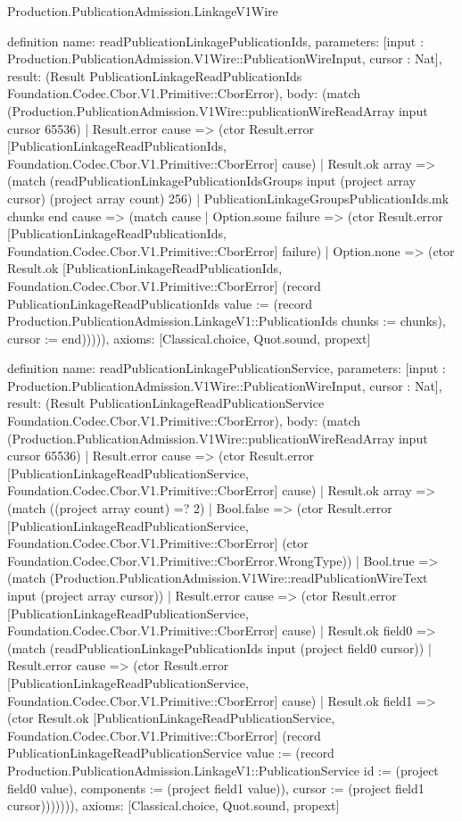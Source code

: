 \begin{lexlean}{Production.PublicationAdmission.LinkageV1Wire}
\begin{semanticmodule}
definition{
  name: readPublicationLinkagePublicationIds,
  parameters: [input : Production.PublicationAdmission.V1Wire::PublicationWireInput, cursor : Nat],
  result: (Result PublicationLinkageReadPublicationIds Foundation.Codec.Cbor.V1.Primitive::CborError),
  body: (match (Production.PublicationAdmission.V1Wire::publicationWireReadArray input cursor 65536)
    | Result.error cause => (ctor Result.error [PublicationLinkageReadPublicationIds, Foundation.Codec.Cbor.V1.Primitive::CborError] cause)
    | Result.ok array => (match (readPublicationLinkagePublicationIdsGroups input (project array cursor) (project array count) 256)
      | PublicationLinkageGroupsPublicationIds.mk chunks end cause => (match cause
        | Option.some failure => (ctor Result.error [PublicationLinkageReadPublicationIds, Foundation.Codec.Cbor.V1.Primitive::CborError] failure)
        | Option.none => (ctor Result.ok [PublicationLinkageReadPublicationIds, Foundation.Codec.Cbor.V1.Primitive::CborError] (record PublicationLinkageReadPublicationIds {value := (record Production.PublicationAdmission.LinkageV1::PublicationIds {chunks := chunks}), cursor := end}))))),
  axioms: [Classical.choice, Quot.sound, propext]
}

definition{
  name: readPublicationLinkagePublicationService,
  parameters: [input : Production.PublicationAdmission.V1Wire::PublicationWireInput, cursor : Nat],
  result: (Result PublicationLinkageReadPublicationService Foundation.Codec.Cbor.V1.Primitive::CborError),
  body: (match (Production.PublicationAdmission.V1Wire::publicationWireReadArray input cursor 65536)
    | Result.error cause => (ctor Result.error [PublicationLinkageReadPublicationService, Foundation.Codec.Cbor.V1.Primitive::CborError] cause)
    | Result.ok array => (match ((project array count) =? 2)
      | Bool.false => (ctor Result.error [PublicationLinkageReadPublicationService, Foundation.Codec.Cbor.V1.Primitive::CborError] (ctor Foundation.Codec.Cbor.V1.Primitive::CborError.WrongType))
      | Bool.true => (match (Production.PublicationAdmission.V1Wire::readPublicationWireText input (project array cursor))
        | Result.error cause => (ctor Result.error [PublicationLinkageReadPublicationService, Foundation.Codec.Cbor.V1.Primitive::CborError] cause)
        | Result.ok field0 => (match (readPublicationLinkagePublicationIds input (project field0 cursor))
          | Result.error cause => (ctor Result.error [PublicationLinkageReadPublicationService, Foundation.Codec.Cbor.V1.Primitive::CborError] cause)
          | Result.ok field1 => (ctor Result.ok [PublicationLinkageReadPublicationService, Foundation.Codec.Cbor.V1.Primitive::CborError] (record PublicationLinkageReadPublicationService {value := (record Production.PublicationAdmission.LinkageV1::PublicationService {id := (project field0 value), components := (project field1 value)}), cursor := (project field1 cursor)})))))),
  axioms: [Classical.choice, Quot.sound, propext]
}


\end{semanticmodule}
\end{lexlean}
